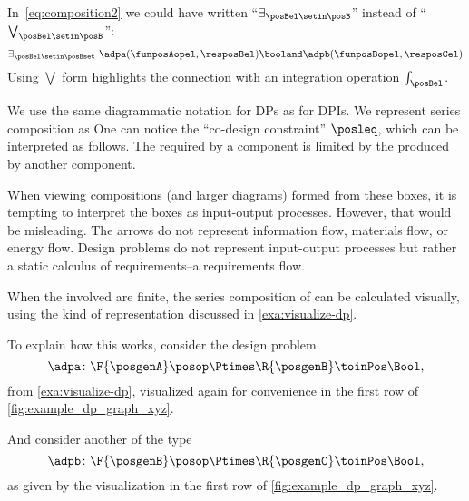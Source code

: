 In~\cref{eq:composition2} we could have written ``$\exists_{\posBel\setin \posB}$'' instead of ``$\bigvee_{\posBel\setin \posB}$'':
\begin{equation}
    \exists_{\posBel \setin \posBset}\ \adpa(\funposAopel,\resposBel) \booland \adpb(\funposBopel,\resposCel)
\end{equation}
Using $\bigvee$ form highlights the connection with an integration operation $\int_\posBel$.

We use the same diagrammatic notation for DPs as for DPIs.
We represent series composition as
%
%
One can notice the ``co-design constraint'' $\posleq$, which can be interpreted as follows.
The  required by a component is limited by the  produced by another component.

When viewing compositions (and larger diagrams) formed from these boxes, it is tempting to interpret the boxes as input-output processes.
However, that would be misleading.
The arrows do not represent information flow, materials flow, or energy flow.
Design problems do not represent input-output processes but rather a static calculus of requirements--a requirements flow.

When the  involved are finite, the series composition of  can be calculated visually, using the kind of representation discussed in \cref{exa:visualize-dp}.

To explain how this works, consider the design problem
\begin{equation}
    \adpa \colon \F{\posgenA} \posop \Ptimes \R{\posgenB} \toinPos \Bool,
\end{equation}
from \cref{exa:visualize-dp}, visualized again for convenience in the first row of \cref{fig:example_dp_graph_xyz}.

And consider another  of the type
\begin{equation}
    \adpb \colon \F{\posgenB} \posop \Ptimes \R{\posgenC} \toinPos \Bool,
\end{equation}
as given by the visualization in the first row of \cref{fig:example_dp_graph_xyz}.

